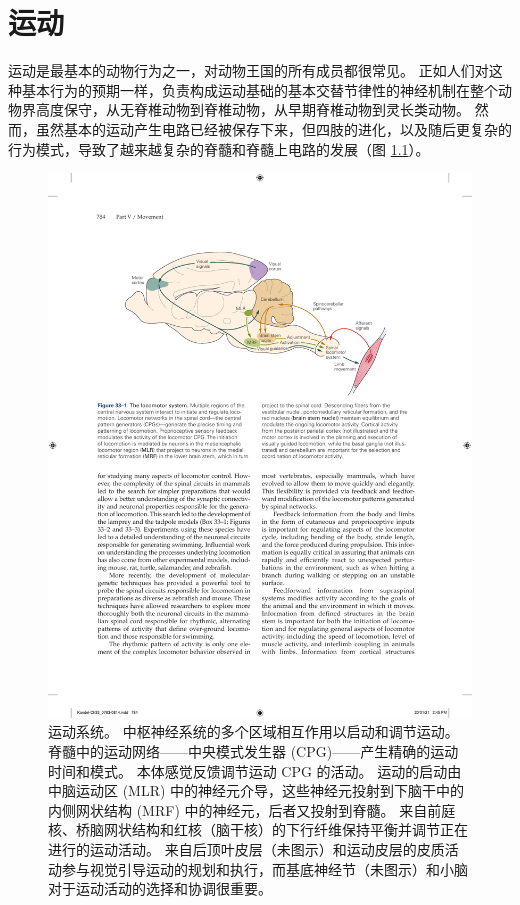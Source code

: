 \chapter{运动} \label{chap:chap33}

运动是最基本的动物行为之一，对动物王国的所有成员都很常见。
正如人们对这种基本行为的预期一样，负责构成运动基础的基本交替节律性的神经机制在整个动物界高度保守，从无脊椎动物到脊椎动物，从早期脊椎动物到灵长类动物。 
然而，虽然基本的运动产生电路已经被保存下来，但四肢的进化，以及随后更复杂的行为模式，导致了越来越复杂的脊髓和脊髓上电路的发展（图 \ref{fig:33_1}）。


\begin{figure}[htbp]
	\centering
	\includegraphics[width=0.85\linewidth]{chap33/fig_33_1}
	\caption{运动系统。 中枢神经系统的多个区域相互作用以启动和调节运动。 脊髓中的运动网络——中央模式发生器 (CPG)——产生精确的运动时间和模式。 本体感觉反馈调节运动 CPG 的活动。 运动的启动由中脑运动区 (MLR) 中的神经元介导，这些神经元投射到下脑干中的内侧网状结构 (MRF) 中的神经元，后者又投射到脊髓。 来自前庭核、桥脑网状结构和红核（脑干核）的下行纤维保持平衡并调节正在进行的运动活动。 来自后顶叶皮层（未图示）和运动皮层的皮质活动参与视觉引导运动的规划和执行，而基底神经节（未图示）和小脑对于运动活动的选择和协调很重要。}
	\label{fig:33_1}
\end{figure}


